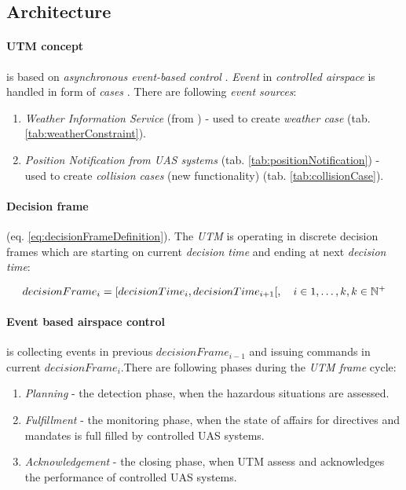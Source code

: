 \subsection{Architecture}\label{sec:utmArchitecture}
\paragraph{UTM concept} is based on \emph{asynchronous event-based control} \cite{zimmer2011rule}. \emph{Event} in \emph{controlled airspace} is handled in form of \emph{cases} \cite{prevot2016uas}. There are following \emph{event sources}:

\begin{enumerate}
    \item \emph{Weather Information Service} (from \cite{zimmer2014selective}) - used to create \emph{weather case} (tab. \ref{tab:weatherConstraint}).
    
    \item \emph{Position Notification from UAS systems} (tab. \ref{tab:positionNotification}) - used to create \emph{collision cases} (new functionality) (tab. \ref{tab:collisionCase}).
\end{enumerate}


\paragraph{Decision frame} (eq. \ref{eq:decisionFrameDefinition}). The \emph{UTM} is operating in discrete decision frames which are starting on current \emph{decision time} and ending at  next \emph{decision  time}:

\begin{equation}\label{eq:decisionFrameDefinition}
    decision Frame_i = [decision Time_i, decision Time_{i+1}[,\quad i \in {1,\dots,k}, k \in \mathbb{N}^+
\end{equation}

\paragraph{Event based airspace control} is collecting  events in  previous $decisionFrame_{i-1}$ and issuing commands in current $decisionFrame_i$.There are following phases during the \emph{UTM frame} cycle:
\begin{enumerate}
    \item \emph{Planning} - the detection phase, when the hazardous situations are assessed.
    
    \item \emph{Fulfillment} - the monitoring phase, when the state of affairs for directives and mandates is full filled by controlled UAS systems. 
    
    \item \emph{Acknowledgement} - the closing phase, when UTM assess and acknowledges the performance of controlled UAS systems.
\end{enumerate}


